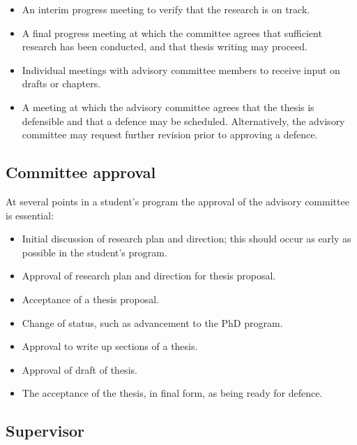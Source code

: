 \documentclass[12pt]{article}
\newcommand{\parnum}{\arabic{parcount}}
\newcounter{parcount}
\newcommand\p{\stepcounter{parcount}\leavevmode{\small[\parnum]}\hspace{0.2em}}
\newcommand\cp{\setcounter{parcount}{0}}
\begin{document}
\begin{itemize}

\item An interim progress meeting to verify that the research is on track.

\item A final progress meeting at which the committee agrees that sufficient
research has been conducted, and that thesis writing may proceed.

\item Individual meetings with advisory committee members to receive input on drafts or chapters.

\item A meeting at which the advisory committee agrees that the thesis is
defensible and that a defence may be scheduled. Alternatively, the advisory
committee may request further revision prior to approving a defence.

\end{itemize}





\subsection{Committee approval}

\cp

\p At several points in a student's program the approval of the advisory committee is essential:
\begin{itemize}
\item Initial discussion of research plan and direction; this should occur as early as possible in the student's program.
\item Approval of research plan and direction for thesis proposal.
\item Acceptance of a thesis proposal.
\item Change of status, such as advancement to the PhD program.
\item Approval to write up sections of a thesis.
\item Approval of draft of thesis.
\item The acceptance of the thesis, in final form, as being ready for defence.
\end{itemize}


\subsection{Supervisor}
\end{document}
